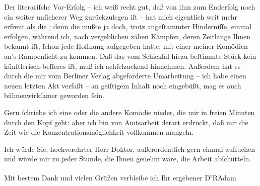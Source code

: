 \pstart
           Der literariſche Vor-Erfolg – ich weiß recht gut, daß von ihm zum Enderfolg noch ein
               weiter unſicherer Weg zurückzulegen iſt – hat mich eigentlich weit mehr erfreut als
               die \label{K_L02538-1v}\label{K_L02538-1}; denn die mußte ja doch, trotz
               angeſtammter Hinderniſſe, einmal erfolgen, während ich, nach vergeblichen zähen
               Kämpfen, deren Zeitlänge Ihnen bekannt iſt,{ }ſchon jede Hoffnung aufgegeben hatte, mit
               einer meiner Komödien an’s Rampenlicht zu kommen. Daß das vom Schickſal hiezu
               beſtimmte Stück kein
               künſtlerisch-beſſeres iſt, muß ich achſelzuckend hinnehmen. Außerdem hat es durch die
               mir vom Berliner Verlag abgeforderte Umarbeitung – ich habe einen neuen
               letzten Akt verfaßt – an geiſtigem Inhalt noch eingebüßt, mag es auch bühnenwirkſamer
               geworden{ }ſein.\pend
           
\pstart
           Gern{ }ſchriebe ich eine oder die andere Komödie {\pb}nieder, die mir in freien Minuten durch
               den Kopf geht: aber ich bin von Amtsarbeit derart erdrückt, daß mir die Zeit wie die
               Konzentrationsmöglichkeit vollkommen mangeln.\pend
           
\pstart
           Ich würde Sie, hochverehrter Herr Doktor, außerordentlich gern einmal aufſuchen und
               würde mir zu jeder Stunde, die Ihnen genehm wäre, die Arbeit abſchütteln.\pend
           
\pstart
           Mit bestem Dank und vielen Grüßen verbleibe ich Ihr ergebener\pend
           \pstart \spacefill\mbox{D\textsuperscript{r}RAdam}\pend{}\endnumbering{}  \newcommand{\dateiname}{L02538}\newcommand{\titel}{Robert Adam an Arthur Schnitzler, 15. 6. 1930}\newcommand{\editorInnen}{Martin Anton Müller und Gerd-Hermann Susen}
